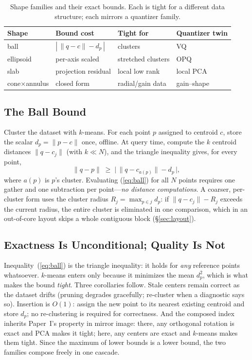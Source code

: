 \documentclass[sigconf,nonacm]{acmart}
\begin{document}
\begin{table}[t]
\caption{Shape families and their exact bounds. Each is tight for a
different data structure; each mirrors a quantizer family.}
\label{tab:shapes}
\small
\begin{tabular}{@{}llll@{}}
\toprule
Shape & Bound cost & Tight for & Quantizer twin \\
\midrule
ball & $|\,\lVert q{-}c\rVert - d_p\,|$ & clusters & VQ \\
ellipsoid & per-axis scaled & stretched clusters & OPQ \\
slab & projection residual & local low rank & local PCA \\
cone$\times$annulus & closed form & radial/gain data & gain--shape \\
\bottomrule
\end{tabular}
\end{table}

\subsection{The Ball Bound}

Cluster the dataset with $k$-means. For each point $p$ assigned to centroid
$c$, store the scalar $d_p = \lVert p - c \rVert$ once, offline. At query
time, compute the $k$ centroid distances $\lVert q - c_j \rVert$ (with
$k \ll N$), and the triangle inequality gives, for every point,
\begin{equation}
\label{eq:ball}
\lVert q - p \rVert \;\ge\; \bigl|\, \lVert q - c_{a(p)} \rVert - d_p \,\bigr|,
\end{equation}
where $a(p)$ is $p$'s cluster. Evaluating (\ref{eq:ball}) for all $N$ points
requires one gather and one subtraction per point---\emph{no distance
computations}. A coarser, per-cluster form uses the cluster radius
$R_j = \max_{p \in j} d_p$: if $\lVert q - c_j \rVert - R_j$ exceeds the
current radius, the entire cluster is eliminated in one comparison, which in
an out-of-core layout skips a whole contiguous block (\S\ref{sec:layout}).

\subsection{Exactness Is Unconditional; Quality Is Not}

Inequality~(\ref{eq:ball}) is the triangle inequality: it holds for
\emph{any} reference points whatsoever. $k$-means enters only because it
minimizes the mean $d_p^2$, which is what makes the bound \emph{tight}. Three
corollaries follow. Stale centers remain correct as the dataset drifts
(pruning degrades gracefully; re-cluster when a diagnostic says so).
Insertion is $O(1)$: assign the new point to its nearest existing centroid
and store $d_p$; no re-clustering is required for correctness. And the
composed index inherits Paper~I's property in mirror image: there, any
orthogonal rotation is exact and PCA makes it tight; here, any centers are
exact and $k$-means makes them tight. Since the maximum of lower bounds is a
lower bound, the two families compose freely in one cascade.
\end{document}
